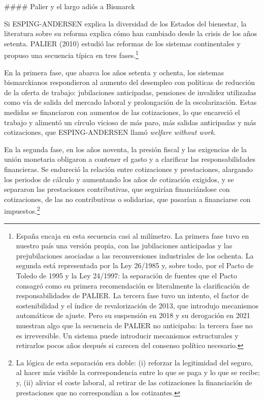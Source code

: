 \documentclass[10pt,a4paper]{article}
\begin{document}
#### Palier y el largo adiós a Bismarck

Si ESPING-ANDERSEN explica la diversidad de los Estados del bienestar, la literatura sobre su reforma explica cómo han cambiado desde la crisis de los años setenta. PALIER (2010) estudió las reformas de los sistemas continentales y propuso una secuencia típica en tres fases.\footnote{España encaja en esta secuencia casi al milímetro. La primera fase tuvo en nuestro país una versión propia, con las jubilaciones anticipadas y las prejubilaciones asociadas a las reconversiones industriales de los ochenta. La segunda está representada por la Ley 26/1985 y, sobre todo, por el Pacto de Toledo de 1995 y la Ley 24/1997: la separación de fuentes que el Pacto consagró como su primera recomendación es literalmente la clarificación de responsabilidades de PALIER. La tercera fase tuvo un intento, el factor de sostenibilidad y el índice de revalorización de 2013, que introdujo mecanismos automáticos de ajuste. Pero su suspensión en 2018 y su derogación en 2021 muestran algo que la secuencia de PALIER no anticipaba: la tercera fase no es irreversible. Un sistema puede introducir mecanismos estructurales y retirarlos pocos años después si carecen del consenso político necesario. 
}

En la primera fase, que abarca los años setenta y ochenta, los sistemas bismarckianos respondieron al aumento del desempleo con políticas de reducción de la oferta de trabajo: jubilaciones anticipadas, pensiones de invalidez utilizadas como vía de salida del mercado laboral y prolongación de la escolarización. Estas medidas se financiaron con aumentos de las cotizaciones, lo que encareció el trabajo y alimentó un círculo vicioso de más paro, más salidas anticipadas y más cotizaciones, que ESPING-ANDERSEN llamó \textit{welfare without work}. 

En la segunda fase, en los años noventa, la presión fiscal y las exigencias de la unión monetaria obligaron a contener el gasto y a clarificar las responsabilidades financieras. Se endureció la relación entre cotizaciones y prestaciones, alargando los periodos de cálculo y aumentando los años de cotización exigidos, y se separaron las prestaciones contributivas, que seguirían financiándose con cotizaciones, de las no contributivas o solidarias, que pasarían a financiarse con impuestos.\footnote{La lógica de esta separación era doble: (i) reforzar la legitimidad del seguro, al hacer más visible la correspondencia entre lo que se paga y lo que se recibe; y, (ii) aliviar el coste laboral, al retirar de las cotizaciones la financiación de prestaciones que no correspondían a los cotizantes.
} 
\end{document}
